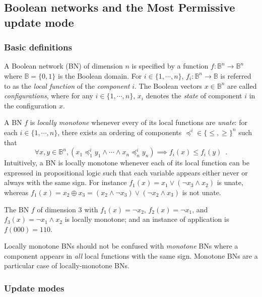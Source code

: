 \documentclass[PCJ,Unicode,screen,mode=plain]{cedram}
\begin{document}
\hypertarget{boolean-networks-and-the-most-permissive-update-mode}{%
\subsection{Boolean networks and the Most Permissive update
mode}\label{boolean-networks-and-the-most-permissive-update-mode}}

\hypertarget{basic-definitions}{%
\subsubsection{Basic definitions}\label{basic-definitions}}

A Boolean network (BN) of dimension \(n\) is specified by a function
\(f: \mathbb B^n\to\mathbb B^n\) where \(\mathbb B = \{0,1\}\) is the
Boolean domain. For \(i\in \{1,\cdots,n\}\),
\(f_i:\mathbb B^n\to\mathbb B\) is referred to as the \emph{local
function} of the \emph{component} \(i\). The Boolean vectors
\(x\in\mathbb B^n\) are called \emph{configurations}, where for any
\(i\in\{1,\cdots,n\}\), \(x_i\) denotes the \emph{state} of component
\(i\) in the configuration \(x\).

A BN \(f\) is \emph{locally monotone} whenever every of its local
functions are \emph{unate}: for each \(i\in\{1,\cdots,n\}\), there
exists an ordering of components \(\preceq^i\in \{\leq, \geq\}^n\) such
that 
$$\forall x,y\in \mathbb B^n,
(x_1\preceq^i_1 y_1 \wedge \cdots \wedge x_n\preceq^i_n y_n) \implies f_i(x) \leq f_i(y)
\enspace.$$
Intuitively, a BN is locally monotone whenever each of its local
function can be expressed in propositional logic such that each variable
appears either never or always with the same sign. For instance
\(f_1(x) = x_1\vee (\neg x_3 \wedge x_2)\) is unate, whereas
\(f_1(x) = x_2 \oplus x_3 = (x_2\wedge\neg x_3)\vee (\neg x_2\wedge x_3)\)
is not unate.

\begin{exam*}
The BN \(f\) of dimension \(3\) with \(f_1(x)=\neg x_2\),
\(f_2(x)=\neg x_1\), and \(f_3(x) = \neg x_1\wedge x_2\) is locally
monotone; and an instance of application is \(f(000)=110\).
\end{exam*}

Locally monotone BNs should not be confused with \emph{monotone} BNs
where a component appears in \emph{all} local functions with the same
sign. Monotone BNs are a particular case of locally-monotone BNs.

\hypertarget{update-modes}{%
\subsubsection{Update modes}\label{update-modes}}
\end{document}

